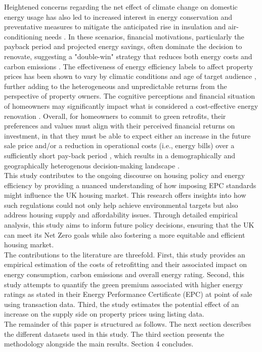 Heightened concerns regarding the net effect of climate change on domestic energy usage has also led to increased interest in energy conservation and preventative measures to mitigate the anticipated rise in insulation and air-conditioning needs \cite{de_cian_households_2019, poritt_scopus_2012}. In these scenarios, financial motivations, particularly the payback period and projected energy savings, often dominate the decision to renovate, suggesting a "double-win" strategy that reduces both energy costs and carbon emissions \cite{joint_research_centre________________________________________european_commission_building_2020}. The effectiveness of energy efficiency labels to affect property prices has been shown to vary by climatic conditions \cite{taltavull_de_la_paz_green_2019} and age of target audience \cite{wilhelmsson_how_2023}, further adding to the heterogeneous and unpredictable returns from the perspective of property owners. The cognitive perceptions and financial situation of homeowners may significantly impact what is considered a cost-effective energy renovation \cite{galassi_role_2017, ud_din_assessing_2023, wilson_why_2015}. Overall, for homeowners to commit to green retrofits, their preferences and values must align with their perceived financial returns on investment, in that they must be able to expect either an increase in the future sale price and/or a reduction in operational costs (i.e., energy bills) over a sufficiently short pay-back period \cite{wilson_why_2015, wang_holistic_2022}, which results in a demographically and geographically heterogenous decision-making landscape \cite{pelenur_motivations_2014}. \\ 


This study contributes to the ongoing discourse on housing policy and energy efficiency by providing a nuanced understanding of how imposing EPC standards might influence the UK housing market. This research offers insights into how such regulations could not only help achieve environmental targets but also address housing supply and affordability issues. Through detailed empirical analysis, this study aims to inform future policy decisions, ensuring that the UK can meet its Net Zero goals while also fostering a more equitable and efficient housing market. \\

The contributions to the literature are threefold. First, this study provides an empirical estimation of the costs of retrofitting and their associated impact on energy consumption, carbon emissions and overall energy rating. Second, this study attempts to quantify the green premium associated with higher energy ratings as stated in their Energy Performance Certificate (EPC) at point of sale using transaction data. Third, the study estimates the potential effect of an increase on the supply side on property prices using listing data. \\

The remainder of this paper is structured as follows. The next section describes the different datasets used in this study. The third section presents the methodology alongside the main results. Section 4 concludes. 



